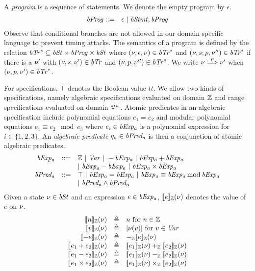 A \emph{program} is a sequence of statements.
We denote the empty program by $\epsilon$.
\begin{eqnarray*}
  \mathit{bProg} & ::= & \epsilon \ |\ \mathit{bStmt}; \mathit{bProg}
\end{eqnarray*}
Observe that conditional branches are not allowed in our domain specific language to prevent timing attacks.
The semantics of a program is defined by the relation $\mathit{bTr}^* \subseteq \mathit{bSt} \times \mathit{bProg} \times \mathit{bSt}$ where $(\nu, \epsilon, \nu) \in \mathit{bTr}^*$ and $(\nu, s; p, \nu'') \in \mathit{bTr}^*$ if there is a $\nu'$ with $(\nu, s, \nu') \in \mathit{bTr}$ and $(\nu, p, \nu'') \in \mathit{bTr}^*$.
We write $\nu \overset{p}{\Longrightarrow} \nu'$ when $(\nu, p, \nu') \in \mathit{bTr}^*$.

For specifications, $\top$ denotes the Boolean value $\mathit{tt}$.
We allow two kinds of specifications, namely algebraic specifications evaluated on domain $\mathbb{Z}$ and range specifications evaluated on domain $\mathbb{V}^{\mathit{w}}$.
Atomic predicates in an algebraic specification include polynomial equations $e_1 = e_2$ and modular polynomial equations $e_1 \equiv e_2 \mod e_3$ where $e_i \in \mathit{bExp_a}$ is a polynomial expression for $i \in \{1, 2, 3\}$.
An \emph{algebraic predicate} $q_a \in \mathit{bPred_a}$ is then a conjunction of atomic algebraic predicates.
\[
\begin{array}{rcl}
  \mathit{bExp_a} & ::= & \mathbb{Z} \ |\ \mathit{Var} \ |\ - \mathit{bExp_a} \ |\ \mathit{bExp_a} + \mathit{bExp_a} \\
          &     & |\ \mathit{bExp_a} - \mathit{bExp_a} \ |\ \mathit{bExp_a} \times \mathit{bExp_a} \\
  \mathit{bPred_a} & ::= & \top \ |\ \mathit{bExp_a} = \mathit{bExp_a}\ |\ \mathit{bExp_a} \equiv \mathit{bExp_a} \mathbin{\textmd{mod}} \mathit{bExp_a} \\
           &     & |\ \mathit{bPred_a} \wedge \mathit{bPred_a} \\
\end{array}
\]
Given a state $\nu \in \mathit{bSt}$ and an expression $e \in \mathit{bExp_a}$, $[\![{e}]\!]_{\mathbb{Z}}(\nu)$ denotes the value of $e$ on $\nu$.
\[
\begin{array}{rcl}
  \zvalueof{n}(\bvst) & \defn & n \textmd{ for $n \in \bbfZ$} \\
  \zvalueof{v}(\bvst) & \defn & \unsigned{\bvst(v)} \textmd{ for $v \in \Var$} \\
  \zvalueof{- e}(\bvst) & \defn & -_\bbfZ \zvalueof{e}(\bvst) \\
  \zvalueof{e_1 + e_2}(\bvst) & \defn & \zvalueof{e_1}(\bvst) +_\bbfZ \zvalueof{e_2}(\bvst) \\
  \zvalueof{e_1 - e_2}(\bvst) & \defn & \zvalueof{e_1}(\bvst) -_\bbfZ \zvalueof{e_2}(\bvst) \\
  \zvalueof{e_1 \times e_2}(\bvst) & \defn & \zvalueof{e_1}(\bvst) \times_\bbfZ \zvalueof{e_2}(\bvst) \\
\end{array}
\]
